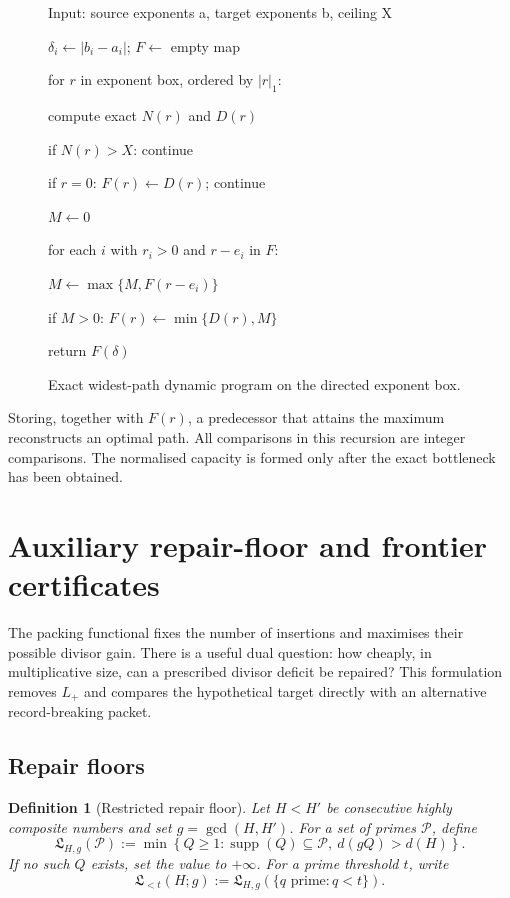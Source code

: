 \documentclass[11pt]{article}
\numberwithin{equation}{section}
\theoremstyle{blueplain}
\theoremstyle{bluedef}
\newtheorem{definition}[theorem]{Definition}
\newcommand{\supp}{\operatorname{supp}}
\begin{document}
\begin{figure}[H]
\begin{tcolorbox}[colback=softgray,colframe=deepblue!70,boxrule=0.7pt,arc=1.2mm]
\small\ttfamily
Input: source exponents a, target exponents b, ceiling X\par
$\delta_i\gets|b_i-a_i|$; $F\gets$ empty map\par
for $r$ in exponent box, ordered by $|r|_1$:\par
\quad compute exact $N(r)$ and $D(r)$\par
\quad if $N(r)>X$: continue\par
\quad if $r=0$: $F(r)\gets D(r)$; continue\par
\quad $M\gets0$\par
\quad for each $i$ with $r_i>0$ and $r-e_i$ in $F$:\par
\qquad $M\gets\max\{M,F(r-e_i)\}$\par
\quad if $M>0$: $F(r)\gets\min\{D(r),M\}$\par
return $F(\delta)$
\end{tcolorbox}
\caption{Exact widest-path dynamic program on the directed exponent box.}
\label{alg:dp}
\end{figure}

Storing, together with $F(r)$, a predecessor that attains the maximum reconstructs an optimal path.  All comparisons in this recursion are integer comparisons.  The normalised capacity is formed only after the exact bottleneck has been obtained.


\section{Auxiliary repair-floor and frontier certificates}
\label{sec:repair-frontier}

The packing functional fixes the number of insertions and maximises their possible divisor gain.  There is a useful dual question: how cheaply, in multiplicative size, can a prescribed divisor deficit be repaired?  This formulation removes $L_+$ and compares the hypothetical target directly with an alternative record-breaking packet.

\subsection{Repair floors}

\begin{definition}[Restricted repair floor]
\label{def:repair-floor}
Let $H<H'$ be consecutive highly composite numbers and set $g=\gcd(H,H')$.  For a set of primes $\mathcal P$, define
\begin{equation}
 \boxed{
 \mathfrak L_{H,g}(\mathcal P):=
 \min\left\{Q\ge1:
 \supp(Q)\subseteq\mathcal P,\ d(gQ)>d(H)\right\}.}
 \label{eq:repair-floor}
\end{equation}
If no such $Q$ exists, set the value to $+\infty$.  For a prime threshold $t$, write
\begin{equation}
 \mathfrak L_{<t}(H;g):=
 \mathfrak L_{H,g}(\{q\text{ prime}:q<t\}).
 \label{eq:left-repair-floor}
\end{equation}
\end{definition}
\end{document}
